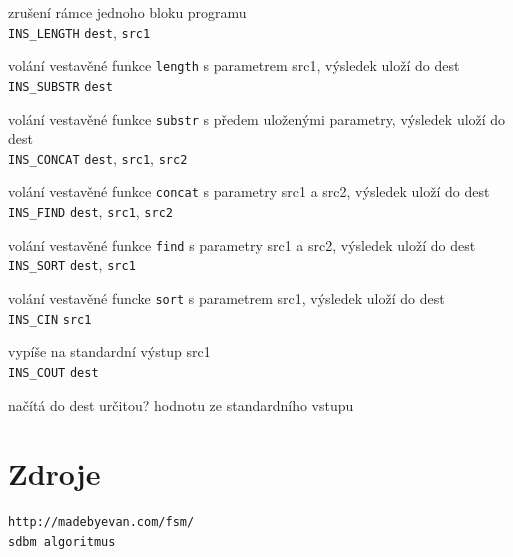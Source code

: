 \documentclass[a4paper, 12pt]{article}
\begin{document}
zrušení rámce jednoho bloku programu\\
\texttt{INS\_LENGTH} \texttt{dest}, \texttt{src1}

volání vestavěné funkce \texttt{length} s parametrem src1, výsledek uloží do dest\\
\texttt{INS\_SUBSTR} \texttt{dest}

volání vestavěné funkce \texttt{substr} s předem uloženými parametry, výsledek uloží do dest\\
\texttt{INS\_CONCAT} \texttt{dest}, \texttt{src1}, \texttt{src2}

volání vestavěné funkce \texttt{concat} s parametry src1 a src2, výsledek uloží do dest\\
\texttt{INS\_FIND} \texttt{dest}, \texttt{src1}, \texttt{src2}

volání vestavěné funkce \texttt{find} s parametry src1 a src2, výsledek uloží do dest\\
\texttt{INS\_SORT} \texttt{dest}, \texttt{src1}

volání vestavěné funcke \texttt{sort} s parametrem src1, výsledek uloží do dest\\
\texttt{INS\_CIN} \texttt{src1}

vypíše na standardní výstup src1\\
\texttt{INS\_COUT} \texttt{dest}

načítá do dest určitou? hodnotu ze standardního vstupu\\

\section{Zdroje}

\begin{verbatim}
http://madebyevan.com/fsm/
sdbm algoritmus
\end{verbatim}
\end{document}
